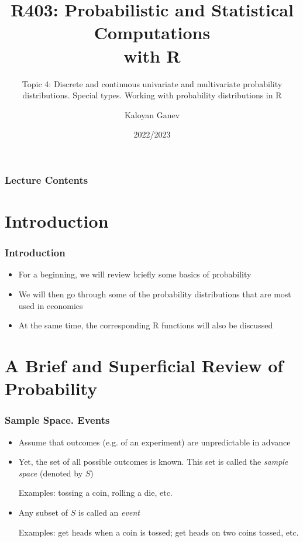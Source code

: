 \documentclass[10pt]{beamer}
\title{R403: Probabilistic and Statistical Computations\\ with R}
\subtitle{Topic 4: \textcolor{myred}{Discrete and continuous univariate and multivariate probability distributions. Special types. Working with probability distributions in R}}
\author{Kaloyan Ganev}
\date{2022/2023}
\theoremstyle{definition}
\begin{document}
\maketitle

\begin{frame}[fragile]
\frametitle{Lecture Contents}
\tableofcontents
\end{frame}

\section{Introduction}
\begin{frame}[fragile]
\frametitle{Introduction}
\begin{itemize}
	\item For a beginning, we will review briefly some basics of probability
		
	\item We will then go through some of the probability distributions that are most used in economics
		
	\item At the same time, the corresponding R functions will also be discussed
\end{itemize}
\end{frame}

\section{A Brief and Superficial Review of Probability}
\begin{frame}[fragile]
\frametitle{Sample Space. Events}
\begin{itemize}
	\item Assume that outcomes (e.g. of an experiment) are unpredictable in advance
	
	\item Yet, the set of all possible outcomes is known. This set is called the \textit{sample space} (denoted by $ S $)
		
	\color{blue}		
	Examples: tossing a coin, rolling a die, etc.
		
	\color{black}
	\item Any subset of $ S $ is called an \textit{event}
	
	\color{blue}
	Examples: get heads when a coin is tossed; get heads on two coins tossed, etc.
		
	\color{black}
\end{itemize}
\end{frame}
\end{document}
